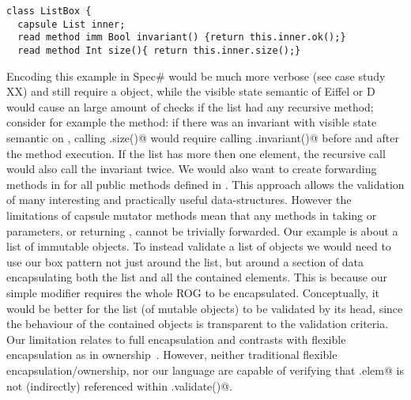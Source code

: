 \loseSpace\loseSpace\loseSpace
\begin{lstlisting}[escapechar=\%]
class ListBox { 
  capsule List inner;
  read method imm Bool invariant() {return this.inner.ok();}
  read method Int size(){ return this.inner.size();}
\end{lstlisting}
\saveSpace
Encoding this example in Spec\# would be much more verbose (see case study XX) and still require
a \Q@ListBox@ object,
while the visible state semantic of Eiffel or D would cause an large amount of \Q@invariant@ checks
if the list had any recursive method; consider for example the \Q@size@ method:
if there was an invariant with visible state semantic on \Q@List@, calling \Q@List.size()@ would require 
calling \Q@List.invariant()@ before and after the method execution. If the list has more then one element, the recursive \Q@size@ call would also call the invariant twice.
We would also want to create forwarding methods in \Q@ListBox@ for all public methods defined in \Q@List@. This approach allows the validation of many interesting and practically useful data-structures.
However the limitations of capsule mutator methods mean that any \Q@mut@ methods in \Q@ListBox@ taking \Q@read@ or \Q@mut@ parameters, or returning \Q@mut@, cannot be trivially forwarded.
Our example is about a list of immutable objects.
To instead validate a list of \Q@mut@ objects we would need to use our box pattern not just around the list,
but around a section of data encapsulating both the list and all the contained elements.
This is because our simple \Q@capsule@ modifier requires the whole ROG to be encapsulated.
Conceptually, it would be better for the list (of mutable objects) to be validated by its
head, since the behaviour of the contained objects is transparent to the validation criteria. 
Our limitation relates to full encapsulation and contrasts with flexible encapsulation as in 
ownership~\cite{ClarkeEtAl98}. However, neither traditional flexible encapsulation/ownership, nor our language are capable of verifying that \Q@List.elem@ is not (indirectly) referenced within \Q@ListBox.validate()@.

